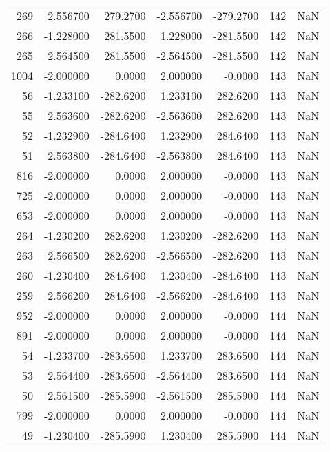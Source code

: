 \begin{tabular}{rrrrrrr}
 269 &    2.556700 &  279.2700 &   -2.556700 &   -279.2700 &         142 & NaN \\
 266 &   -1.228000 &  281.5500 &    1.228000 &   -281.5500 &         142 & NaN \\
 265 &    2.564500 &  281.5500 &   -2.564500 &   -281.5500 &         142 & NaN \\
1004 &   -2.000000 &    0.0000 &    2.000000 &     -0.0000 &         143 & NaN \\
  56 &   -1.233100 & -282.6200 &    1.233100 &    282.6200 &         143 & NaN \\
  55 &    2.563600 & -282.6200 &   -2.563600 &    282.6200 &         143 & NaN \\
  52 &   -1.232900 & -284.6400 &    1.232900 &    284.6400 &         143 & NaN \\
  51 &    2.563800 & -284.6400 &   -2.563800 &    284.6400 &         143 & NaN \\
 816 &   -2.000000 &    0.0000 &    2.000000 &     -0.0000 &         143 & NaN \\
 725 &   -2.000000 &    0.0000 &    2.000000 &     -0.0000 &         143 & NaN \\
 653 &   -2.000000 &    0.0000 &    2.000000 &     -0.0000 &         143 & NaN \\
 264 &   -1.230200 &  282.6200 &    1.230200 &   -282.6200 &         143 & NaN \\
 263 &    2.566500 &  282.6200 &   -2.566500 &   -282.6200 &         143 & NaN \\
 260 &   -1.230400 &  284.6400 &    1.230400 &   -284.6400 &         143 & NaN \\
 259 &    2.566200 &  284.6400 &   -2.566200 &   -284.6400 &         143 & NaN \\
 952 &   -2.000000 &    0.0000 &    2.000000 &     -0.0000 &         144 & NaN \\
 891 &   -2.000000 &    0.0000 &    2.000000 &     -0.0000 &         144 & NaN \\
  54 &   -1.233700 & -283.6500 &    1.233700 &    283.6500 &         144 & NaN \\
  53 &    2.564400 & -283.6500 &   -2.564400 &    283.6500 &         144 & NaN \\
  50 &    2.561500 & -285.5900 &   -2.561500 &    285.5900 &         144 & NaN \\
 799 &   -2.000000 &    0.0000 &    2.000000 &     -0.0000 &         144 & NaN \\
  49 &   -1.230400 & -285.5900 &    1.230400 &    285.5900 &         144 & NaN \\

\end{tabular}
